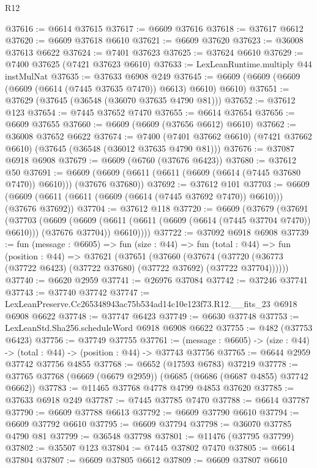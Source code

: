 \begin{lexlean}{R12}
\begin{coremodule}
@37616 := @6614 @37615
@37617 := @6609 @37616
@37618 := @37617 @6612
@37620 := @6609 @37618 @6610
@37621 := @6609 @37620
@37623 := @36008 @37613 @6622
@37624 := @7401 @37623
@37625 := @37624 @6610
@37629 := @7400 @37625 (@7421 @37623 @6610)
@37633 := LexLeanRuntime.multiply @44 instMulNat
@37635 := @37633 @6908 @249
@37645 := @6609 (@6609 (@6609 (@6609 (@6614 (@7445 @37635 @7470)) @6613) @6610) @6610)
@37651 := @37629 (@37645 (@36548 (@36070 @37635 @4790 @81)))
@37652 := @37612 @123
@37654 := @7445 @37652 @7470
@37655 := @6614 @37654
@37656 := @6609 @37655
@37660 := @6609 (@6609 (@37656 @6612) @6610)
@37662 := @36008 @37652 @6622
@37674 := @7400
    (@7401 @37662 @6610)
    (@7421 @37662 @6610)
    (@37645 (@36548 (@36012 @37635 @4790 @81)))
@37676 := @37087 @6918 @6908
@37679 := @6609 (@6760 (@37676 @6423))
@37680 := @37612 @50
@37691 := @6609 (@6609 (@6611 (@6611 (@6609 (@6614 (@7445 @37680 @7470)) @6610))) (@37676 @37680))
@37692 := @37612 @101
@37703 := @6609 (@6609 (@6611 (@6611 (@6609 (@6614 (@7445 @37692 @7470)) @6610))) (@37676 @37692))
@37704 := @37612 @118
@37720 := @6609
    (@37679
      (@37691
        (@37703
          (@6609
            (@6609 (@6611 (@6611 (@6609 (@6614 (@7445 @37704 @7470)) @6610))) (@37676 @37704))
            @6610))))
@37722 := @37092 @6918 @6908
@37739 := fun (message : @6605) =>
  fun (size : @44) =>
  fun (total : @44) =>
  fun (position : @44) =>
  @37621
    (@37651
      (@37660
        (@37674 (@37720 (@36773 (@37722 @6423) (@37722 @37680) (@37722 @37692) (@37722 @37704))))))
@37740 := @6620 @2959
@37741 := @26976 @37084
@37742 := @37246 @37741
@37743 := @37740 @37742
@37747 := LexLeanPreserve.Cc265348943ac75b534ad14c10e123f73.R12.__fits_23 @6918 @6908 @6622
@37748 := @37747 @6423
@37749 := @6630 @37748
@37753 := LexLeanStd.Sha256.scheduleWord @6918 @6908 @6622
@37755 := @482 (@37753 @6423)
@37756 := @37749 @37755
@37761 := (message : @6605) -> (size : @44) -> (total : @44) -> (position : @44) -> @37743 @37756
@37765 := @6644 @2959 @37742 @37756 @4855
@37768 := @6652 (@17593 @6783) @37219
@37778 := @37765 @37768 (@6669 (@6679 @2959)) (@6685 (@6686 (@6687 @4855) @37742 @6662))
@37783 := @11465 @37768 @4778 @4799 @4853 @37620
@37785 := @37633 @6918 @249
@37787 := @7445 @37785 @7470
@37788 := @6614 @37787
@37790 := @6609 @37788 @6613
@37792 := @6609 @37790 @6610
@37794 := @6609 @37792 @6610
@37795 := @6609 @37794
@37798 := @36070 @37785 @4790 @81
@37799 := @36548 @37798
@37801 := @11476 (@37795 @37799)
@37802 := @35507 @123
@37804 := @7445 @37802 @7470
@37805 := @6614 @37804
@37807 := @6609 @37805 @6612
@37809 := @6609 @37807 @6610

\end{coremodule}
\end{lexlean}
